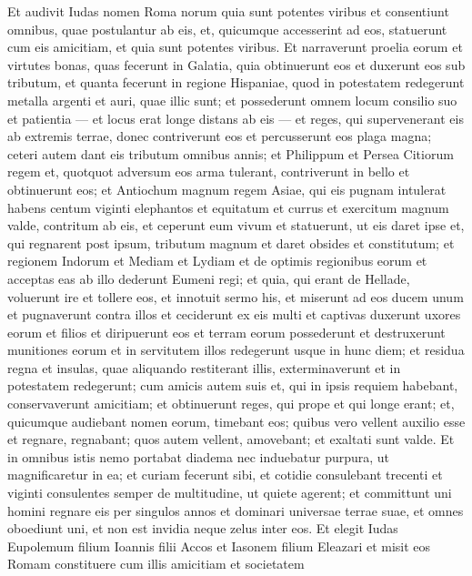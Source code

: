 \begin{biblechapter}  
\verse Et audivit Iudas nomen Roma norum quia sunt potentes viribus et consentiunt omnibus, quae postulantur ab eis, et, quicumque accesserint ad eos, statuerunt cum eis amicitiam, 
\verse et quia sunt potentes viribus. Et narraverunt proelia eorum et virtutes bonas, quas fecerunt in Galatia, quia obtinuerunt eos et duxerunt eos sub tributum, 
\verse et quanta fecerunt in regione Hispaniae, quod in potestatem redegerunt metalla argenti et auri, quae illic sunt; 
\verse et possederunt omnem locum consilio suo et patientia — et locus erat longe distans ab eis — et reges, qui supervenerant eis ab extremis terrae, donec contriverunt eos et percusserunt eos plaga magna; ceteri autem dant eis tributum omnibus annis; 
\verse et Philippum et Persea Citiorum regem et, quotquot adversum eos arma tulerant, contriverunt in bello et obtinuerunt eos;  
\verse et Antiochum magnum regem Asiae, qui eis pugnam intulerat habens centum viginti elephantos et equitatum et currus et exercitum magnum valde, contritum ab eis, 
\verse et ceperunt eum vivum et statuerunt, ut eis daret ipse et, qui regnarent post ipsum, tributum magnum et daret obsides et constitutum; 
\verse et regionem Indorum et Mediam et Lydiam et de optimis regionibus eorum et acceptas eas ab illo dederunt Eumeni regi; 
\verse et quia, qui erant de Hellade, voluerunt ire et tollere eos, et innotuit sermo his, 
\verse et miserunt ad eos ducem unum et pugnaverunt contra illos et ceciderunt ex eis multi et captivas duxerunt uxores eorum et filios et diripuerunt eos et terram eorum possederunt et destruxerunt munitiones eorum et in servitutem illos redegerunt usque in hunc diem; 
\verse et residua regna et insulas, quae aliquando restiterant illis, exterminaverunt et in potestatem redegerunt; 
\verse cum amicis autem suis et, qui in ipsis requiem habebant, conservaverunt amicitiam; et obtinuerunt reges, qui prope et qui longe erant; et, quicumque audiebant nomen eorum, timebant eos;  
\verse quibus vero vellent auxilio esse et regnare, regnabant; quos autem vellent, amovebant; et exaltati sunt valde. 
\verse Et in omnibus istis nemo portabat diadema nec induebatur purpura, ut magnificaretur in ea; 
\verse et curiam fecerunt sibi, et cotidie consulebant trecenti et viginti consulentes semper de multitudine, ut quiete agerent; 
\verse et committunt uni homini regnare eis per singulos annos et dominari universae terrae suae, et omnes oboediunt uni, et non est invidia neque zelus inter eos. 
\verse Et elegit Iudas Eupolemum filium Ioannis filii Accos et Iasonem filium Eleazari et misit eos Romam constituere cum illis amicitiam et societatem 

\end{biblechapter}
